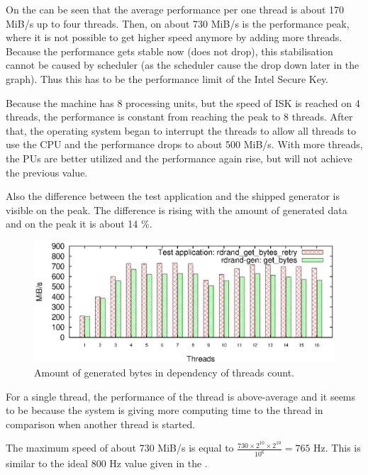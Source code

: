 \par{
On the  can be seen that the average performance per one thread is about 170 MiB/s up to four threads. Then, on about 730 MiB/s is the performance peak, where it is not possible to get higher speed anymore by adding more threads. Because the performance gets stable now (does not drop), this stabilisation cannot be caused by scheduler (as the scheduler cause the drop down later in the graph). Thus this has to be the performance limit of the Intel Secure Key. 
}

\par{
Because the machine has 8 processing units, but the speed of ISK is reached on 4 threads, the performance is constant from reaching the peak to 8 threads. After that, the operating system began to interrupt the threads to allow all threads to use the CPU and the performance drops to about 500 MiB/s. With more threads, the PUs are better utilized and the performance again rise, but will not achieve the previous value.
}

\par{
Also the difference between the test application and the shipped generator is visible on the peak. The difference is rising with the amount of generated data and on the peak it is about 14 \%.
}

\begin{figure}[h!]
  \centering
 \includegraphics[width=15cm]{fig/tests/scaling.eps} %
\caption{Amount of generated bytes in dependency of threads count.}
\label{fig:testing:threadsScalability}
\end{figure}

\par{
For a single thread, the performance of the thread is above-average and it seems to be because the system is giving more computing time to the thread in comparison when another thread is started.
}

\par{
The maximum speed of about 730 MiB/s is equal to $\frac{730 \times 2^{10} \times 2^{10}}{10^6}=765$ Hz. This is similar to the ideal 800 Hz value given in the .
}

